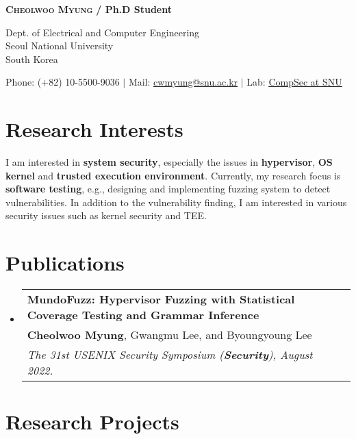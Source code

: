 \documentclass[letterpaper,11pt]{article}
\makeatletter
\newcommand{\pubSubheading}[3]{
  \vspace{0pt}\item
    \begin{tabular*}{0.97\textwidth}[t]{l@{\extracolsep{\fill}}r}
      \vspace{5pt}
      \textbf{#1} \\ \vspace{5pt}
      #2 \\
      \textit{\small#3}
    \end{tabular*}\vspace{-7pt}
}
\newcommand{\resumeSubHeadingListStart}{\begin{itemize}[leftmargin=0.15in, label={}]}
\newcommand{\resumeSubHeadingListEnd}{\end{itemize}}
\makeatother
\begin{document}


\begin{center}
    \textbf{\Huge \scshape Cheolwoo Myung} \textbf{ /  Ph.D Student} \\ \vspace{10pt}
    
    Dept. of Electrical and Computer Engineering \\
    Seoul National University \\
    South Korea \\ \vspace{10pt}
    
    \small Phone: (+82) 10-5500-9036 $|$ Mail: \href{mailto:cwmyung@snu.ac.kr}{\underline{cwmyung@snu.ac.kr}} $|$ 
    Lab: \href{https://compsec.snu.ac.kr}{\underline{CompSec at SNU}}
\end{center}

\vspace{15pt}
\section{Research Interests}

I am interested in \textbf{system security}, especially the issues in \textbf{hypervisor}, \textbf{OS kernel} and \textbf{trusted execution environment}.
Currently, my research focus is \textbf{software testing}, e.g., designing and implementing fuzzing system to detect vulnerabilities. In addition to the vulnerability finding, I am interested in various security issues such as kernel security and TEE.

\vspace{10pt}

\section{Publications}
  \resumeSubHeadingListStart

    \pubSubheading
      {MundoFuzz: Hypervisor Fuzzing with Statistical Coverage Testing and Grammar Inference}
      {\textbf{Cheolwoo Myung}, Gwangmu Lee, and Byoungyoung Lee}
      {The 31st USENIX Security Symposium (\textbf{Security}), August 2022.
}
    \resumeSubHeadingListEnd

\vspace{10pt}
\section{Research Projects}
\end{document}
